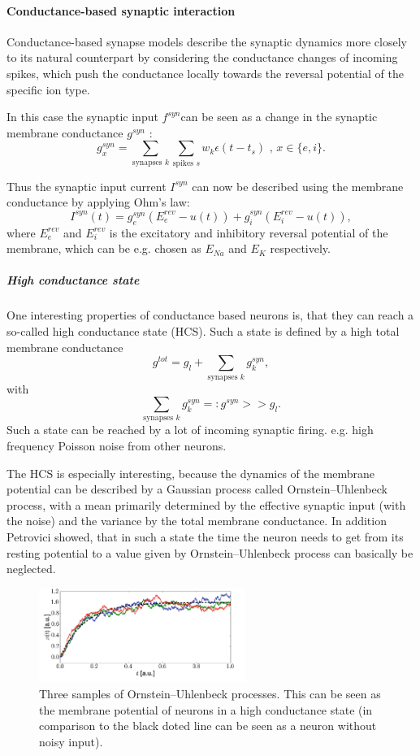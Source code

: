 \paragraph{Conductance-based synaptic interaction} Conductance-based synapse models describe the synaptic dynamics more closely to its natural counterpart by considering the conductance changes of incoming spikes, which push the conductance locally towards the reversal potential of the specific ion type. 

In this case the synaptic input $f^{syn} $can be seen as a change in the synaptic membrane conductance $g^{syn}$ :
\[
g_x^{syn} = \sum_{\text{synapses } k } \sum_{\text{spikes } s} w_k \epsilon(t - t_s) \text{ ,      } x \in \{e, i\}.
\]

Thus the synaptic input current $I^{syn}$ can now be described using the membrane conductance by applying Ohm's law:
\[
I^{syn}(t) = g_e^{syn} (E_e^{rev} - u(t)) + g_i^{syn} (E_i^{rev} - u(t)),
\]
where $E_e^{rev}$ and $E_i^{rev}$ is the excitatory and inhibitory reversal potential of the membrane, which can be e.g. chosen as $E_{Na}$ and $E_{K}$ respectively.  

\subparagraph{High conductance state} One interesting properties of conductance based neurons is, that they can reach a so-called high conductance state (HCS). Such a state is defined by a high total membrane conductance 
\[
g^{tot} = g_l + \sum_{\text{synapses } k} g_k^{syn},
\]
with 
\[
\sum_{\text{synapses } k} g_k^{syn} =: g^{syn} >> g_l .
\]
Such a state can be reached by a lot of incoming synaptic firing. e.g. high frequency Poisson noise from other neurons. 

The HCS is especially interesting, because the dynamics of the membrane potential can be described by a Gaussian process called Ornstein–Uhlenbeck process, with a mean primarily determined by the effective synaptic input (with the noise) and the variance by the total membrane conductance.
In addition Petrovici showed, that in such a state the time the neuron needs to get from its resting potential to a value given by Ornstein–Uhlenbeck process can basically be neglected.

\begin{figure}
	\centering
    	\includegraphics[width=0.6\textwidth]{imgs/orn_uhl_process.png} 
    \caption{Three samples of Ornstein–Uhlenbeck processes. This can be seen as the membrane potential of neurons in a high conductance state (in comparison to the black doted line can be seen as a neuron without noisy input).}
	\label{fig:ornuhl}
\end{figure}


